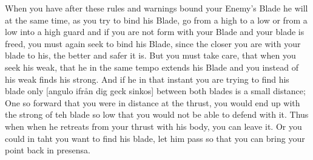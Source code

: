 When you have after these rules and warnings bound your Enemy's Blade
he will at the same time, as you try to bind his Blade, go from a high
to a low or from a low into a high guard and if you are not form with
your Blade and your blade is freed, you must again seek to bind his
Blade, since the closer you are with your blade to his, the better and
safer it is. But you must take care, that when you seek his weak, that
he in the same tempo extends his Blade and you instead of his weak
finds his strong. And if he in that instant you are trying to find his
blade only [angulo ifrån dig geck sinkos] between both blades is a
small distance; One so forward that you were in distance at the
thrust, you would end up with the strong of teh blade so low that you
would not be able to defend with it. Thus when when he retreats from
your thrust with his body, you can leave it. Or you could in taht you
want to find his blade, let him pass so that you can bring your point
back in presensa.


